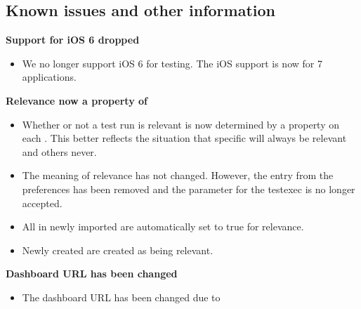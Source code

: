 \subsection{Known issues and other information}
\textbf{Support for iOS 6 dropped}
\begin{itemize}
\item We no longer support iOS 6 for testing. The iOS support is now for 7 applications. 
\end{itemize}

\textbf{Relevance now a property of \gdsuites{}}
\begin{itemize}
\item Whether or not a test run is relevant is now determined by a property on each \gdsuite{}. This better reflects the situation that specific \gdsuites{} will always be relevant and others never. 
\item The meaning of relevance has not changed. However, the entry from the preferences has been removed and the parameter for the testexec is no longer accepted. 
\item All \gdsuites{} in newly imported \gdprojects{} are automatically set to true for relevance.
\item Newly created \gdsuites{} are created as being relevant.
\end{itemize}

\textbf{Dashboard URL has been changed}
\begin{itemize}
\item The dashboard URL has been changed due to 
\end{itemize}
